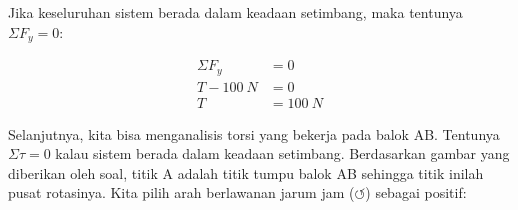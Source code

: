 \documentclass[14pt]{article}\usepackage[utf8]{inputenc}
\theoremstyle{definition}
\theoremstyle{definition}
\theoremstyle{definition}
\begin{document}
\begin{enumerate}
{\begin{tikzpicture}[x=0.75pt,y=0.75pt,yscale=-1,xscale=1]
	
\end{tikzpicture}

\par
}

Jika keseluruhan sistem berada dalam keadaan setimbang, maka tentunya $\Sigma F_y = 0$:

\vspace{-1.6em}

\begin{align*}
\Sigma F_y &= 0\\
T - 100 \ N &= 0 \\
T &= 100 \ N
\end{align*}

\pagebreak

Selanjutnya, kita bisa menganalisis torsi yang bekerja pada balok AB. Tentunya  $\Sigma \tau = 0$ kalau sistem berada dalam keadaan setimbang. Berdasarkan gambar yang diberikan oleh soal, titik A adalah titik tumpu balok AB sehingga titik inilah pusat rotasinya. Kita pilih arah berlawanan jarum jam ({\boldmath $\circlearrowleft$}) sebagai positif:



{
\centering

\tikzset{
	pattern size/.store in=\mcSize, 
	pattern size = 5pt,
	pattern thickness/.store in=\mcThickness, 
	pattern thickness = 0.3pt,
	pattern radius/.store in=\mcRadius, 
	pattern radius = 1pt}
\makeatletter
{}
\makeatother
{} %

\begin{tikzpicture}[x=0.75pt,y=0.75pt,yscale=-1,xscale=1]
	

\end{tikzpicture}}
\end{enumerate}
\end{document}
